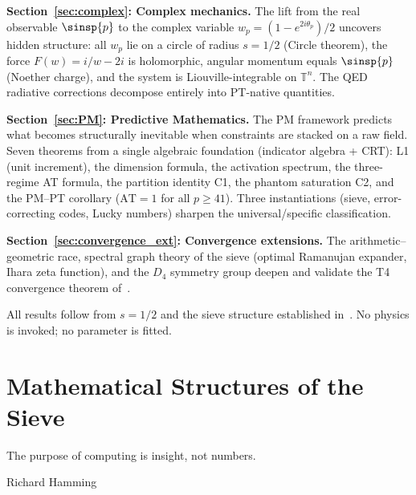 \documentclass[12pt,a4paper]{article}
\begin{document}
\textbf{Section~\ref{sec:complex}: Complex mechanics.}
The lift from the real observable $\sinsp{p}$ to the complex variable
$w_p = (1 - e^{2i\theta_p})/2$ uncovers hidden structure: all $w_p$
lie on a circle of radius $s = 1/2$ (Circle theorem), the force
$F(w) = i/w - 2i$ is holomorphic, angular momentum equals $\sinsp{p}$
(Noether charge), and the system is Liouville-integrable on
$\mathbb{T}^n$.  The QED radiative corrections decompose entirely into
PT-native quantities.

\textbf{Section~\ref{sec:PM}: Predictive Mathematics.}
The PM framework predicts what becomes structurally inevitable when
constraints are stacked on a raw field.  Seven theorems from a single
algebraic foundation (indicator algebra + CRT): L1 (unit increment),
the dimension formula, the activation spectrum, the three-regime AT
formula, the partition identity C1, the phantom saturation C2, and the
PM--PT corollary ($\mathrm{AT} = 1$ for all $p \geq 41$).  Three
instantiations (sieve, error-correcting codes, Lucky numbers) sharpen
the universal/specific classification.

\textbf{Section~\ref{sec:convergence_ext}: Convergence extensions.}
The arithmetic--geometric race, spectral graph theory of the sieve
(optimal Ramanujan expander, Ihara zeta function), and the $D_4$
symmetry group deepen and validate the T4 convergence theorem
of~\cite{companion_M3}.

All results follow from $s = 1/2$ and the sieve structure established
in~\cite{companion_M1,companion_M2,companion_M3}.  No physics is
invoked; no parameter is fitted.


\section{Mathematical Structures of the Sieve}
\label{sec:math_structures}

\epigraph{The purpose of computing is insight, not numbers.}{Richard Hamming}
\end{document}

